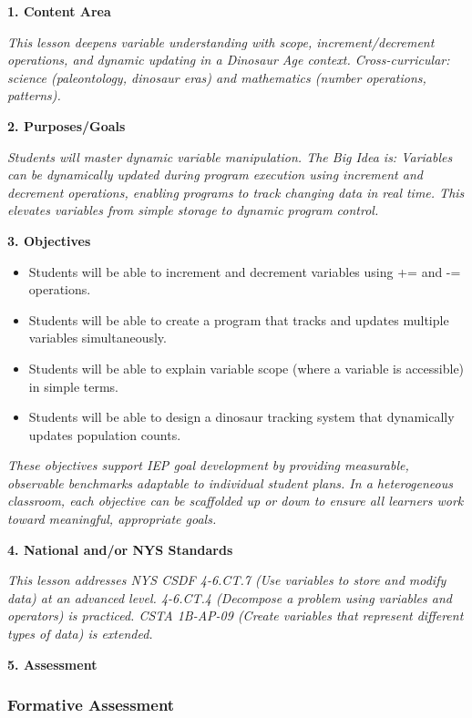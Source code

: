 \documentclass[11pt,letterpaper]{article}
\begin{document}
\textbf{1. Content Area}

\textit{This lesson deepens variable understanding with scope, increment/decrement operations, and dynamic updating in a Dinosaur Age context. Cross-curricular: science (paleontology, dinosaur eras) and mathematics (number operations, patterns).}

\textbf{2. Purposes/Goals}

\textit{Students will master dynamic variable manipulation. The Big Idea is: Variables can be dynamically updated during program execution using increment and decrement operations, enabling programs to track changing data in real time. This elevates variables from simple storage to dynamic program control.}

\textbf{3. Objectives}

\begin{itemize}
  \item Students will be able to increment and decrement variables using += and -= operations.

  \item Students will be able to create a program that tracks and updates multiple variables simultaneously.

  \item Students will be able to explain variable scope (where a variable is accessible) in simple terms.

  \item Students will be able to design a dinosaur tracking system that dynamically updates population counts.
\end{itemize}

\textit{These objectives support IEP goal development by providing measurable, observable benchmarks adaptable to individual student plans. In a heterogeneous classroom, each objective can be scaffolded up or down to ensure all learners work toward meaningful, appropriate goals.}

\textbf{4. National and/or NYS Standards}

\textit{This lesson addresses NYS CSDF 4-6.CT.7 (Use variables to store and modify data) at an advanced level. 4-6.CT.4 (Decompose a problem using variables and operators) is practiced. CSTA 1B-AP-09 (Create variables that represent different types of data) is extended.}

\newpage
\textbf{5. Assessment}

\subsubsection{Formative Assessment}
\end{document}
